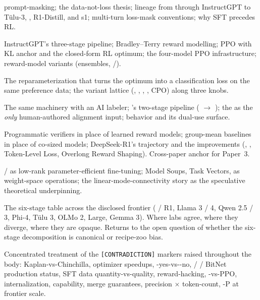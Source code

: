 \begin{description}
  prompt-masking; the data-not-loss thesis; lineage from  through
  InstructGPT to T\"ulu-3, , R1-Distill, and s1; multi-turn
  loss-mask conventions; why SFT precedes RL.
\item[\cref{sec:rlhf} --- RLHF.] InstructGPT's three-stage pipeline;
  Bradley--Terry reward modelling; PPO with KL anchor and the
  closed-form RL optimum; the four-model PPO infrastructure;
  reward-model variants (ensembles, /).
\item[\cref{sec:dpo} --- DPO and offline preference.] The
  reparameterization that turns the  optimum into a classification
  loss on the same preference data; the variant lattice (, ,
  , , CPO) along three knobs.
\item[\cref{sec:rlaif-cai} --- RLAIF and Constitutional AI.] The same
   machinery with an AI labeler; 's two-stage pipeline (
  $\to$ ); the  as the \emph{only} human-authored
  alignment input;  behavior and its dual-use surface.
\item[\cref{sec:rlvr-grpo} --- RLVR and GRPO.] Programmatic verifiers
  in place of learned reward models; group-mean baselines in place of
  co-sized  models; DeepSeek-R1's  trajectory and the 
  improvements (, , Token-Level Loss,
  Overlong Reward Shaping). Cross-paper anchor for Paper~3.
\item[\cref{sec:adaptation-and-merging} --- Adaptation and merging.]
   /  as low-rank parameter-efficient fine-tuning; Model
  Soups, Task Vectors,  as weight-space operations; the
  linear-mode-connectivity story as the speculative theoretical
  underpinning.
\item[\cref{sec:frontier-snapshot} --- Frontier-2026 snapshot.] The
  six-stage table across the disclosed frontier ( / R1,
  Llama 3 / 4, Qwen 2.5 / 3, Phi-4, T\"ulu 3, OLMo 2,  Large,
  Gemma 3). Where labs agree, where they diverge, where they are
  opaque. Returns to the open question of whether the six-stage
  decomposition is canonical or recipe-zoo bias.
\item[\cref{sec:contradictions} --- Live contradictions.] Concentrated
  treatment of the \texttt{[CONTRADICTION]} markers raised throughout
  the body: Kaplan-vs-Chinchilla, optimizer speedups, -yes-vs--no,
   /  / BitNet production status, SFT data quantity-vs-quality,
  reward-hacking, -vs-PPO,  internalization,  capability,
  merge guarantees, precision $\times$ token-count, \textmu-P at
  frontier scale.
\end{description}

